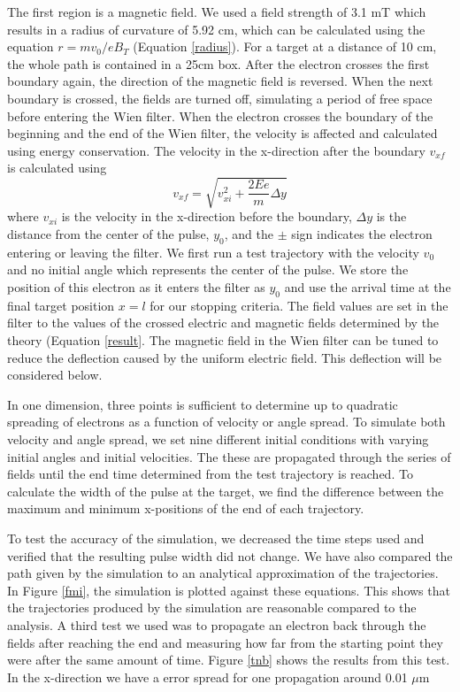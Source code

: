 \documentclass[12pt,letterpaper]{article}
\newcommand{\eqqref}[1]{Equation \ref{#1}}
\newcommand{\dy}{\Delta y}
\begin{document}
The first region is a magnetic field. 
We used a field strength of 3.1 mT which results in a radius of curvature of 5.92 cm, which can be calculated using the equation $r=mv_0/eB_T$ (\eqqref{radius}). 
For a target at a distance of 10 cm, the whole path is contained in a 25cm box. 
After the electron crosses the first boundary again, the direction of the magnetic field is reversed.
When the next boundary is crossed, the fields are turned off, simulating a period of free space before entering the Wien filter. 
When the electron crosses the boundary of the beginning and the end of the Wien filter, the velocity is affected and calculated using energy conservation. 
The velocity in the x-direction after the boundary $v_{xf}$ is calculated using 
\[
v_{xf}=\sqrt{v_{xi}^2+\frac{2 E e}{m}\dy}
\]
where $v_{xi}$ is the velocity in the x-direction before the boundary, $\dy$ is the distance from the center of the pulse, $y_0$, and the $\pm$ sign indicates the electron entering or leaving the filter.
We first run a test trajectory with the velocity $v_0$ and no initial angle which represents the center of the pulse. 
We store the position of this electron as it enters the filter as $y_0$ and use the arrival time at the final target position $x=l$ for our stopping criteria.
The field values are set in the filter to the values of the crossed electric and magnetic fields determined by the theory (\eqqref{result}. 
The magnetic field in the Wien filter can be tuned to reduce the deflection caused by the uniform electric field. This deflection will be considered below. 
  
In one dimension, three points is sufficient to determine up to quadratic spreading of electrons as a function of velocity or angle spread. To simulate both velocity and angle spread, we set nine different initial conditions with varying initial angles and initial velocities. 
The these are propagated through the series of fields until the end time determined from the test trajectory is reached.
To calculate the width of the pulse at the target, we find the difference between the maximum and minimum x-positions of the end of each trajectory.

To test the accuracy of the simulation, we decreased the time steps used and verified that the resulting pulse width did not change. 
We have also compared the path given by the simulation to an analytical approximation of the trajectories.
In Figure \ref{fmi}, the simulation is plotted against these equations. This shows that the trajectories produced by the simulation are reasonable compared to the analysis. 
A third test we used was to propagate an electron back through the fields after reaching the end and measuring how far from the starting point they were after the same amount of time. Figure \ref{tnb} shows the results from this test. In the x-direction we have a error spread for one propagation around 0.01 $\mu$m 
\end{document}
